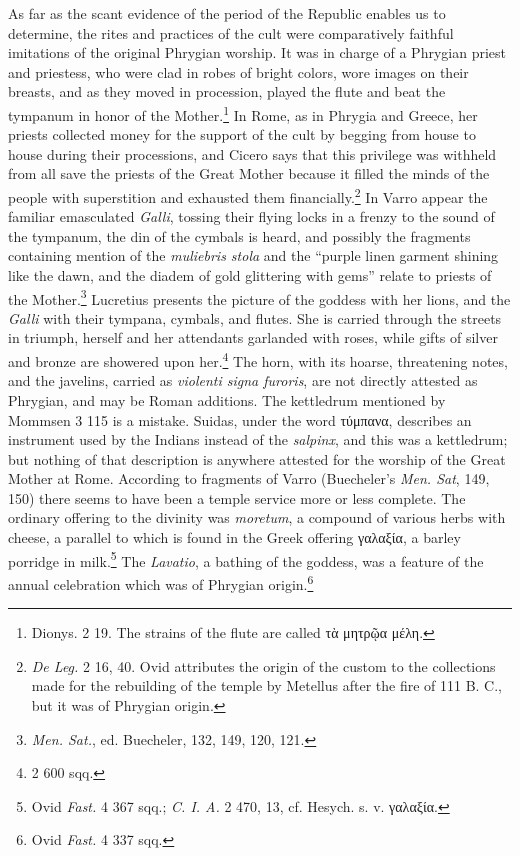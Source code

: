 \documentclass[a4paper, 11pt, oneside, polutonikogreek, english]{article}
\begin{document}
As far as the scant evidence of the period of the Republic enables us to determine, the rites and practices of the cult were comparatively faithful imitations of the original Phrygian worship. It was in charge of a Phrygian priest and priestess, who were clad in robes of bright colors, wore images on their breasts, and as they moved in procession, played the flute and beat the tympanum in honor of the Mother.\footnote{Dionys. 2 19. The strains of the flute are called τὰ μητρῷα μέλη.} In Rome, as in Phrygia and Greece, her priests collected money for the support of the cult by begging from house to house during their processions, and Cicero says that this privilege was withheld from all save the priests of the Great Mother because it filled the minds of the people with superstition and exhausted them financially.\footnote{\emph{De Leg.} 2 16, 40. Ovid attributes the origin of the custom to the collections made for the rebuilding of the temple by Metellus after the fire of 111 B. C., but it was of Phrygian origin.} In Varro appear the familiar emasculated \emph{Galli}, tossing their flying locks in a frenzy to the sound of the tympanum, the din of the cymbals is heard, and possibly the fragments containing mention of the \emph{muliebris stola} and the ``purple linen garment shining like the dawn, and the diadem of gold glittering with gems'' relate to priests of the Mother.\footnote{\emph{Men. Sat.}, ed. Buecheler, 132, 149, 120, 121.} Lucretius presents the picture of the goddess with her lions, and the \emph{Galli} with their tympana, cymbals, and flutes. She is carried through the streets in triumph, herself and her attendants garlanded with roses, while gifts of silver and bronze are showered upon her.\footnote{2 600 sqq.} The horn, with its hoarse, threatening notes, and the javelins, carried as \emph{violenti signa furoris}, are not directly attested as Phrygian, and may be Roman additions. The kettledrum mentioned by Mommsen 3 115 is a mistake. Suidas, under the word τύμπανα, describes an instrument used by the Indians instead of the \emph{salpinx}, and this was a kettledrum; but nothing of that description is anywhere attested for the worship of the Great Mother at Rome. According to fragments of Varro (Buecheler's \emph{Men. Sat}, 149, 150) there seems to have been a temple service more or less complete. The ordinary offering to the divinity was \emph{moretum}, a compound of various herbs with cheese, a parallel to which is found in the Greek offering γαλαξία, a barley porridge in milk.\footnote{Ovid \emph{Fast.} 4 367 sqq.; \emph{C. I. A.} 2 470, 13, cf. Hesych. s. v. γαλαξία.} The \emph{Lavatio}, a bathing of the goddess, was a feature of the annual celebration which was of Phrygian origin.\footnote{Ovid \emph{Fast.} 4 337 sqq.}
\end{document}
